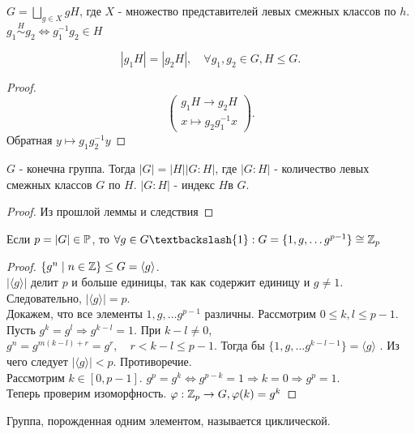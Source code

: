 \documentclass[12pt]{report}
\begin{document}
\begin{cor}
    $G =\bigsqcup\limits_{g \in X} g H $, где $X$ - множество представителей левых смежных классов по $h$. \\
    $g_1 \stackrel{H}\sim g_2 \Leftrightarrow g_1^{-1} g_2 \in H$
\end{cor}
\begin{lm}
    \[
    |g_1H| = |g_2H|, \quad \forall g_1, g_2 \in  G, H \le G 
    .\] 
\end{lm}
\begin{proof}
     \[
     \left ( 
     \begin{array}{c}
     g_1H \to g_2H \\
     x \mapsto g_2 g_1^{-1} x
     \end{array}
     \right )
     .\] 
     Обратная $y \mapsto g_1 g_2^{-1} y$
\end{proof}
\begin{thm}[Лагранж]
    $G$ - конечна группа. Тогда $|G| = |H| |G:H|$, где $|G:H|$ - количество левых смежных классов $G$ по $H$. $|G:H|$ - индекс $H$в $G$.
\end{thm}
\begin{proof}
    Из прошлой леммы и следствия
\end{proof}
\begin{cor}
    Если $p = |G| \in  \mathbb{P}$, то $\forall g \in  G \textbackslash {1}: G = \{1, g, \ldots g^{p-1}\} \cong \Z_p$
\end{cor}
\begin{proof}
    $\{g^n\mid n \in  \mathbb{Z}\} \le G = \langle g \rangle$. \\
    $|\langle g \rangle|$ делит $p$ и больше единицы, так как содержит единицу и $g \ne 1$. Следовательно, $|\langle g \rangle|=p$. \\
    Докажем, что все элементы $1, g, \ldots g^{p-1}$ различны. Рассмотрим $0 \le k, l \le p -1$.
    Пусть $g^k = g^l \Rightarrow g^{k-l} = 1$. При $k - l \ne 0$, $g^n = g^{m(k-l) + r} = g^r, \quad r < k -l \le p-1$. 
    Тогда бы $\{1, g, \ldots g^{k-l-1}\} = \langle g \rangle$ . Из чего следует $| \langle g \rangle| < p$. Противоречие.\\
    Рассмотрим $k \in  [0, p-1]$.
    $g^p = g^k \Leftrightarrow g^{p-k} = 1 \Rightarrow k = 0 \Rightarrow g^p = 1$.\\
    Теперь проверим изоморфность.
    $\varphi : \mathbb{Z}_p \to G, \varphi (k) = g^k$
\end{proof}
\begin{defn}
    Группа, порожденная одним элементом, называется циклической.
\end{defn}
\end{document}

